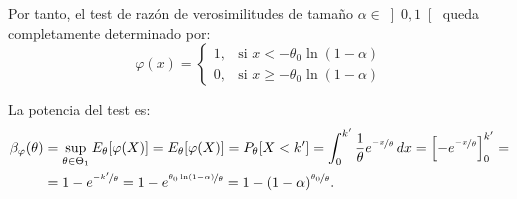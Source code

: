 \begin{ejercicio}
    Por tanto, el test de razón de verosimilitudes de tamaño $\alpha \in \left]0, 1\right[$ queda completamente determinado por:
    \begin{equation*}
        \varphi(x) =
        \begin{cases}
            1, & \text{si } x < -\theta_0 \ln(1 - \alpha) \\
            0, & \text{si } x \geq -\theta_0 \ln(1 - \alpha)
        \end{cases}
    \end{equation*}
    
    La potencia del test es:
    \begin{align*}
        \beta_\varphi(\theta) &= \sup_{\theta \in \Theta_1} E_\theta[\varphi(X)] = E_\theta[\varphi(X)] = P_\theta[X < k'] = \int_{0}^{k'} \frac{1}{\theta} e^{\nicefrac{-x}{\theta}} \, dx = \left[-e^{\nicefrac{-x}{\theta}}\right]_{0}^{k'} =\\&= 1 - e^{\nicefrac{-k'}{\theta}} = 1 - e^{\nicefrac{\theta_0 \ln(1 - \alpha)}{\theta}} = 1 - (1 - \alpha)^{\nicefrac{\theta_0}{\theta}}.
    \end{align*}
\end{ejercicio}


